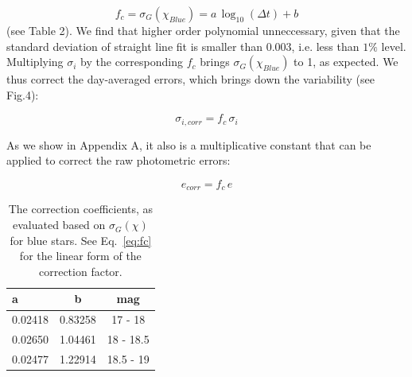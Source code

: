 \documentclass[fleqn,usenatbib]{mnras}  %
\begin{document}
\begin{equation}
\label{eq:fc}
f_{c} = \sigma_{G}(\chi_{Blue}) = a  \, \log_{10}(\Delta t) + b
\end{equation}
(see Table 2). We find that higher order polynomial unneccessary, given that the standard deviation of straight line fit is smaller than  0.003, i.e. less than $1\%$ level. 
Multiplying  $\sigma_{i}$ by the corresponding $f_{c}$ brings  $\sigma_{G}(\chi_{Blue})$ to 1, as expected. We thus correct the day-averaged errors, which brings down the variability (see Fig.4):

\begin{equation}
\sigma_{i,corr}  = f_{c} \, \sigma_{i}  
\end{equation} 

As we show in Appendix A, it also is a multiplicative constant that can be applied to correct the raw photometric errors: 

\begin{equation}
e_{corr} = f_{c} \, e
\end{equation}

\begin{table}

\caption{The correction coefficients, as evaluated based on $\sigma_{G}(\chi)$ for blue stars. See Eq.~\ref{eq:fc} for the linear form of the correction factor.}
\label{tab:fc}
\begin{tabular}{ l|cc } 
a  & b & mag \\ 
 \hline
0.02418  &  0.83258 &  17   - 18  \\
0.02650  &  1.04461 &  18   - 18.5  \\
0.02477  &  1.22914 &  18.5 - 19  
\end{tabular}
\end{table}
\end{document}
